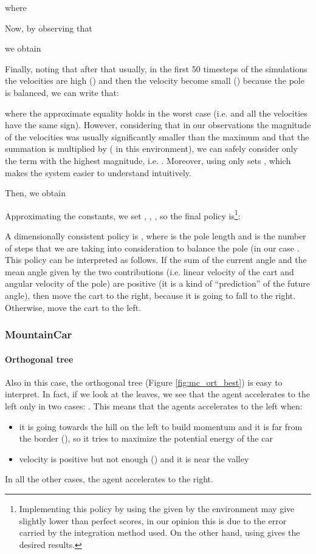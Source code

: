 \documentclass[review,english]{elsarticle}
\begin{document}
where 


Now, by observing that

we obtain



Finally, noting that after that usually, in the first 50 timesteps of the simulations the velocities are high () and then the velocity become small () because the pole is balanced, we can write that:

where the approximate equality holds in the worst case (i.e.  and all the velocities have the same sign).
However, considering that in our observations the magnitude of the velocities was usually significantly smaller than the maximum and that the summation is multiplied by  ( in this environment), we can safely consider only the term with the highest magnitude, i.e. .
Moreover, using only  sets , which makes the system easier to understand intuitively.

Then, we obtain



Approximating the constants, we set , , , so the final policy is\footnote{Implementing this policy by using the  given by the environment may give slightly lower than perfect scores, in our opinion this is due to the error carried by the integration method used. On the other hand, using  gives the desired results.}:


A dimensionally consistent policy is , where  is the pole length and  is the number of steps that we are taking into consideration to balance the pole (in our case .
This policy can be interpreted as follows.
If the sum of the current angle and the mean angle given by the two contributions (i.e. linear velocity of the cart and angular velocity of the pole) are positive (it is a kind of ``prediction'' of the future angle), then move the cart to the right, because it is going to fall to the right. 
Otherwise, move the cart to the left.

\subsubsection{MountainCar}
\paragraph{Orthogonal tree}
Also in this case, the orthogonal tree (Figure \ref{fig:mc_ort_best}) is easy to interpret.
In fact, if we look at the leaves, we see that the agent accelerates to the left only in two cases: .
This means that the agents accelerates to the left when: 
\begin{itemize}
    \item it is going towards the hill on the left to build momentum and it is far from the border (), so it tries to maximize the potential energy of the car
    \item velocity is positive but not enough () and it is near the valley
\end{itemize}
In all the other cases, the agent accelerates to the right.
\end{document}
